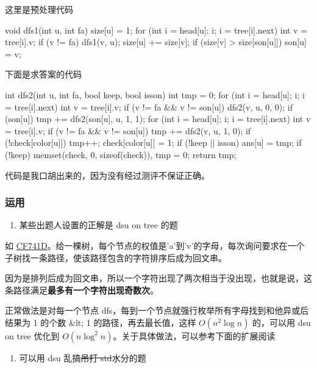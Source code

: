 这里是预处理代码

\begin{cppcode}
void dfs1(int u, int fa) {
  size[u] = 1;
  for (int i = head[u]; i; i = tree[i].next) {
    int v = tree[i].v;
    if (v != fa) {
      dfs1(v, u);
      size[u] += size[v];
      if (size[v] > size[son[u]]) son[u] = v;
    }
  }
}
\end{cppcode}

下面是求答案的代码

\begin{cppcode}
int dfs2(int u, int fa, bool keep, bool isson) {
  int tmp = 0;
  for (int i = head[u]; i; i = tree[i].next) {
    int v = tree[i].v;
    if (v != fa && v != son[u]) {
      dfs2(v, u, 0, 0);
    }
  }
  if (son[u]) tmp += dfs2(son[u], u, 1, 1);
  for (int i = head[u]; i; i = tree[i].next) {
    int v = tree[i].v;
    if (v != fa && v != son[u]) {
      tmp += dfs2(v, u, 1, 0);
    }
  }
  if (!check[color[u]]) {
    tmp++;
    check[color[u]] = 1;
  }
  if (!keep || isson) ans[u] = tmp;
  if (!keep) memset(check, 0, sizeof(check)), tmp = 0;
  return tmp;
}
\end{cppcode}

代码是我口胡出来的，因为没有经过测评不保证正确。

\subsubsection{运用}

\begin{enumerate}
\item 某些出题人设置的正解是 dsu on tree 的题
\end{enumerate}

如 \href{http://codeforces.com/problemset/problem/741/D}{CF741D}。给一棵树，每个节点的权值是'a'到'v'的字母，每次询问要求在一个子树找一条路径，使该路径包含的字符排序后成为回文串。

因为是排列后成为回文串，所以一个字符出现了两次相当于没出现，也就是说，这条路径满足\textbf{最多有一个字符出现奇数次}。

正常做法是对每一个节点 dfs，每到一个节点就强行枚举所有字母找到和他异或后结果为 1 的个数 \&lt; 1 的路径，再去最长值，这样 $O(n^2\log n)$ 的，可以用 dsu on tree 优化到 $O(n\log^2n)$。关于具体做法，可以参考下面的扩展阅读

\begin{enumerate}
\item 可以用 dsu 乱搞\sout{吊打 std}水分的题
\end{enumerate}

